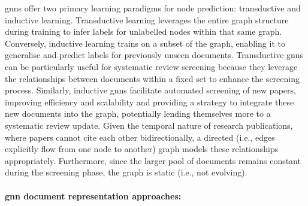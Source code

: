 \documentclass[10pt,oneside]{book}
\begin{document}
\gls*{gnn}s offer two primary learning paradigms for node prediction: transductive and inductive learning. Transductive learning leverages the entire graph structure during training to infer labels for unlabelled nodes within that same graph. Conversely, inductive learning trains on a subset of the graph, enabling it to generalise and predict labels for previously unseen documents. Transductive \gls*{gnn}s can be particularly useful for systematic review screening because they leverage the relationships between documents within a fixed set to enhance the screening process. Similarly, inductive \gls*{gnn}s facilitate automated screening of new papers, improving efficiency and scalability and providing a strategy to integrate these new documents into the graph, potentially lending themselves more to a systematic review update. Given the temporal nature of research publications, where papers cannot cite each other bidirectionally, a directed (i.e., edges explicitly flow from one node to another) graph models these relationships appropriately. Furthermore, since the larger pool of documents remains constant during the screening phase, the graph is static (i.e., not evolving).


\paragraph{\gls*{gnn} document representation approaches: }
\end{document}

